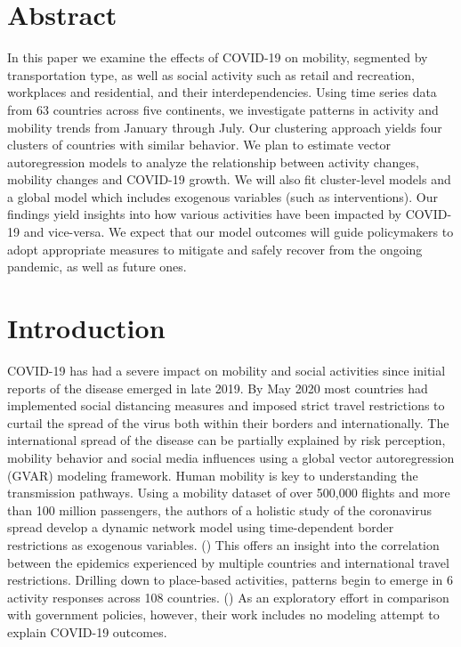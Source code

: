 \documentclass[titlepage,oneside,12pt]{article}
\newcommand{\trbcite}[1]{({\it \citenum{#1}})}
\newcommand{\?}{\stackrel{?}{=}}
\begin{document}
\section{Abstract}
In this paper we examine the effects of COVID-19 on mobility, segmented by transportation type, as well as social activity such as retail and recreation, workplaces and residential, and their interdependencies.
Using time series data from 63 countries across five continents,
we investigate patterns in activity and mobility trends from January through July.
Our clustering approach yields four clusters of countries with similar behavior.
We plan to estimate vector autoregression models  to analyze the relationship between activity changes, mobility changes and COVID-19 growth.
We will also fit cluster-level models and a global model which includes exogenous variables (such as interventions).
Our findings yield insights into how various activities have been impacted by COVID-19 and vice-versa.
We expect that our model outcomes will guide policymakers to adopt  appropriate  measures to mitigate and safely recover from the ongoing pandemic, as well as future ones.

\section{Introduction}
COVID-19 has had a severe impact on mobility and social activities since initial reports of the disease emerged in late 2019. By May 2020 most countries had implemented social distancing measures and imposed strict travel restrictions to curtail the spread of the virus both within their borders and internationally.
The international spread of the disease can be partially explained by risk perception, mobility behavior and social media influences using a global vector autoregression (GVAR) modeling framework\cite{milani2020covid19}.
Human mobility is key to understanding the transmission pathways. Using a mobility dataset of over 500,000 flights and more than 100 million passengers, the authors of a holistic study of the coronavirus spread develop a dynamic network model using time-dependent border restrictions as exogenous variables. \trbcite{zhang2020pathways} This offers an insight into the correlation between the epidemics experienced by multiple countries and international travel restrictions.
Drilling down to place-based activities, patterns begin to emerge in 6 activity responses across 108 countries. \trbcite{mckenzie2020country} As an exploratory effort in comparison with government policies, however, their work includes no modeling attempt to explain COVID-19 outcomes. 
\end{document}
